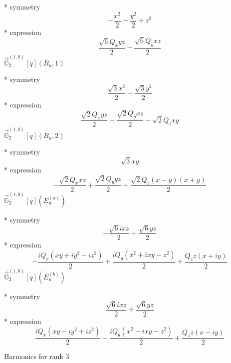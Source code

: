 \documentclass[fleqn,8pt]{jsarticle}
\begin{document}
\noindent\quad ** symmetry
\begin{dmath*}
- \frac{x^{2}}{2} - \frac{y^{2}}{2} + z^{2}
\end{dmath*}
\noindent\quad ** expression
\begin{dmath*}
\frac{\sqrt{6} Q_{x} y z}{2} - \frac{\sqrt{6} Q_{y} x z}{2}
\end{dmath*}
\noindent\quad $\vec{\mathbb{G}}_{2}^{(1,0)}[q](B_{u},1)$

\noindent\quad ** symmetry
\begin{dmath*}
\frac{\sqrt{3} x^{2}}{2} - \frac{\sqrt{3} y^{2}}{2}
\end{dmath*}
\noindent\quad ** expression
\begin{dmath*}
\frac{\sqrt{2} Q_{x} y z}{2} + \frac{\sqrt{2} Q_{y} x z}{2} - \sqrt{2} Q_{z} x y
\end{dmath*}
\noindent\quad $\vec{\mathbb{G}}_{2}^{(1,0)}[q](B_{u},2)$

\noindent\quad ** symmetry
\begin{dmath*}
\sqrt{3} x y
\end{dmath*}
\noindent\quad ** expression
\begin{dmath*}
- \frac{\sqrt{2} Q_{x} x z}{2} + \frac{\sqrt{2} Q_{y} y z}{2} + \frac{\sqrt{2} Q_{z} \left(x - y\right) \left(x + y\right)}{2}
\end{dmath*}
\noindent\quad $\vec{\mathbb{G}}_{2}^{(1,0)}[q](E_{u}^{(a)})$

\noindent\quad ** symmetry
\begin{dmath*}
- \frac{\sqrt{6} i x z}{2} + \frac{\sqrt{6} y z}{2}
\end{dmath*}
\noindent\quad ** expression
\begin{dmath*}
- \frac{i Q_{x} \left(x y + i y^{2} - i z^{2}\right)}{2} + \frac{i Q_{y} \left(x^{2} + i x y - z^{2}\right)}{2} + \frac{Q_{z} z \left(x + i y\right)}{2}
\end{dmath*}
\noindent\quad $\vec{\mathbb{G}}_{2}^{(1,0)}[q](E_{u}^{(b)})$

\noindent\quad ** symmetry
\begin{dmath*}
\frac{\sqrt{6} i x z}{2} + \frac{\sqrt{6} y z}{2}
\end{dmath*}
\noindent\quad ** expression
\begin{dmath*}
\frac{i Q_{x} \left(x y - i y^{2} + i z^{2}\right)}{2} - \frac{i Q_{y} \left(x^{2} - i x y - z^{2}\right)}{2} + \frac{Q_{z} z \left(x - i y\right)}{2}
\end{dmath*}

\noindent * Harmonics for rank 3
\end{document}

